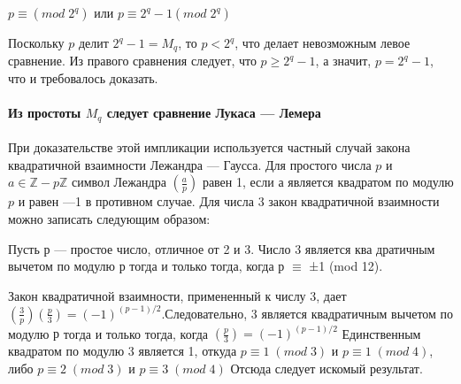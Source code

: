 	 \begin{center}
	 	$p\equiv (mod \; 2^q)$ или $ p\equiv2^q-1 (mod \; 2^q)$
	 \end{center}
     Поскольку $p$ делит $2^q-1 = M_q$, то $p<2^q$, что делает невозможным левое сравнение. Из правого сравнения следует, что $p\geqslant 2^q-1$, а значит, $p=2^q-1$, что и требовалось доказать.
     
     \pagebreak
     
     
     
     \paragraph{Из простоты $M_q$  следует сравнение Лукаса — Лемера} 
     
     \noindent 
     
     При доказательстве этой импликации используется частный случай закона квадратичной взаимности Лежандра — Гаусса. Для простого  числа $p$ и $a \in \mathbb Z - p\mathbb Z$ символ Лежандра  $(\frac{a}{p})$ равен 1, если $а$ является
     квадратом по модулю $p$ и равен —1 в противном случае. Для числа 3  закон квадратичной взаимности можно записать следующим образом:
     
     \begin{lemma}
     \noindent
     
     Пусть $р$ — простое число, отличное от 2 и 3. Число 3 является ква дратичным вычетом по модулю $р$ тогда и только тогда, когда $р$ $\equiv$ ±1
     (mod 12).
     \end{lemma}
     \begin{myproof}
     \noindent
     
 	 
 	 	
 	 	Закон квадратичной взаимности, примененный к числу 3, дает  $(\frac{3}{p})(\frac{p}{3}) = (-1)^{(p-1)/2}$.Следовательно, 3 является квадратичным вычетом по модулю $р$ тогда и только тогда, когда $(\frac{p}{3}) = (-1)^{(p-1)/2}$ Единственным квадратом по модулю 3 является 1, откуда $p \equiv 1 \;(mod \; 3)$ и $p \equiv 1 \;(mod \; 4)$, либо $p \equiv 2 \;(mod \; 3)$ и $p \equiv 3 \;(mod \; 4)$ Отсюда следует искомый результат.
	 \end{myproof}
 
